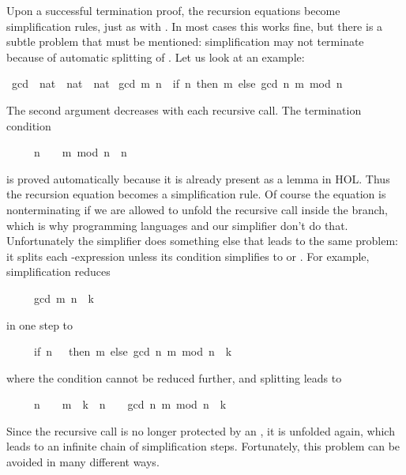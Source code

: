 \begin{isabellebody}
\begin{isamarkuptext}
Upon a successful termination proof, the recursion equations become
simplification rules, just as with .
In most cases this works fine, but there is a subtle
problem that must be mentioned: simplification may not
terminate because of automatic splitting of .
Let us look at an example:%
\end{isamarkuptext}%
\isamarkuptrue%
\isamarkupfalse%
\ gcd\ {\isacharcolon}{\isacharcolon}\ {\isachardoublequoteopen}nat\ {\isasymRightarrow}\ nat\ {\isasymRightarrow}\ nat{\isachardoublequoteclose}\ \isanewline
{\isachardoublequoteopen}gcd\ m\ n\ {\isacharequal}\ {\isacharparenleft}if\ n{\isacharequal}{}\ then\ m\ else\ gcd\ n\ {\isacharparenleft}m\ mod\ n{\isacharparenright}{\isacharparenright}{\isachardoublequoteclose}%
\begin{isamarkuptext}%
\noindent
The second argument decreases with each recursive call.
The termination condition
\begin{isabelle}%
\ \ \ \ \ n\ {\isasymnoteq}\ {}\ {\isasymLongrightarrow}\ m\ mod\ n\ {\isacharless}\ n%
\end{isabelle}
is proved automatically because it is already present as a lemma in
HOL\@.  Thus the recursion equation becomes a simplification
rule. Of course the equation is nonterminating if we are allowed to unfold
the recursive call inside the  branch, which is why programming
languages and our simplifier don't do that. Unfortunately the simplifier does
something else that leads to the same problem: it splits 
each -expression unless its
condition simplifies to  or .  For
example, simplification reduces
\begin{isabelle}%
\ \ \ \ \ gcd\ m\ n\ {\isacharequal}\ k%
\end{isabelle}
in one step to
\begin{isabelle}%
\ \ \ \ \ {\isacharparenleft}if\ n\ {\isacharequal}\ {}\ then\ m\ else\ gcd\ n\ {\isacharparenleft}m\ mod\ n{\isacharparenright}{\isacharparenright}\ {\isacharequal}\ k%
\end{isabelle}
where the condition cannot be reduced further, and splitting leads to
\begin{isabelle}%
\ \ \ \ \ {\isacharparenleft}n\ {\isacharequal}\ {}\ {\isasymlongrightarrow}\ m\ {\isacharequal}\ k{\isacharparenright}\ {\isasymand}\ {\isacharparenleft}n\ {\isasymnoteq}\ {}\ {\isasymlongrightarrow}\ gcd\ n\ {\isacharparenleft}m\ mod\ n{\isacharparenright}\ {\isacharequal}\ k{\isacharparenright}%
\end{isabelle}
Since the recursive call  is no longer protected by
an , it is unfolded again, which leads to an infinite chain of
simplification steps. Fortunately, this problem can be avoided in many
different ways.


\end{isamarkuptext}
\end{isabellebody}
